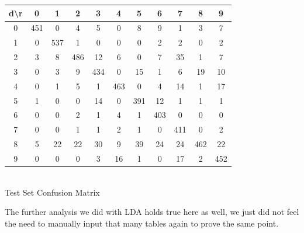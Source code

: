 \documentclass[10pt]{extarticle}
\begin{document}
\begin{minipage}{.6\textwidth}
	\begin{center}
	\begin{tabular}{c | c c c c c c c c c c}
		d\textbackslash r & 0 & 1 & 2 & 3 & 4 & 5 & 6 & 7 & 8 & 9\\ \hline
		0&451&0&4&5&0&8&9&1&3&7\\
		1&0&537&1&0&0&0&2&2&0&2\\
		2&3&8&486&12&6&0&7&35&1&7\\
		3&0&3&9&434&0&15&1&6&19&10\\
		4&0&1&5&1&463&0&4&14&1&17\\
		5&1&0&0&14&0&391&12&1&1&1\\
		6&0&0&2&1&4&1&403&0&0&0\\
		7&0&0&1&1&2&1&0&411&0&2\\
		8&5&22&22&30&9&39&24&24&462&22\\
		9&0&0&0&3&16&1&0&17&2&452\\
	\end{tabular}\\
	\bigskip
	Test Set Confusion Matrix
	\end{center}
	\textrm{ }
\end{minipage}	
The further analysis we did with LDA holds true here as well, we just did not feel the need to manually input that many tables again to prove the same point.
\end{document}
